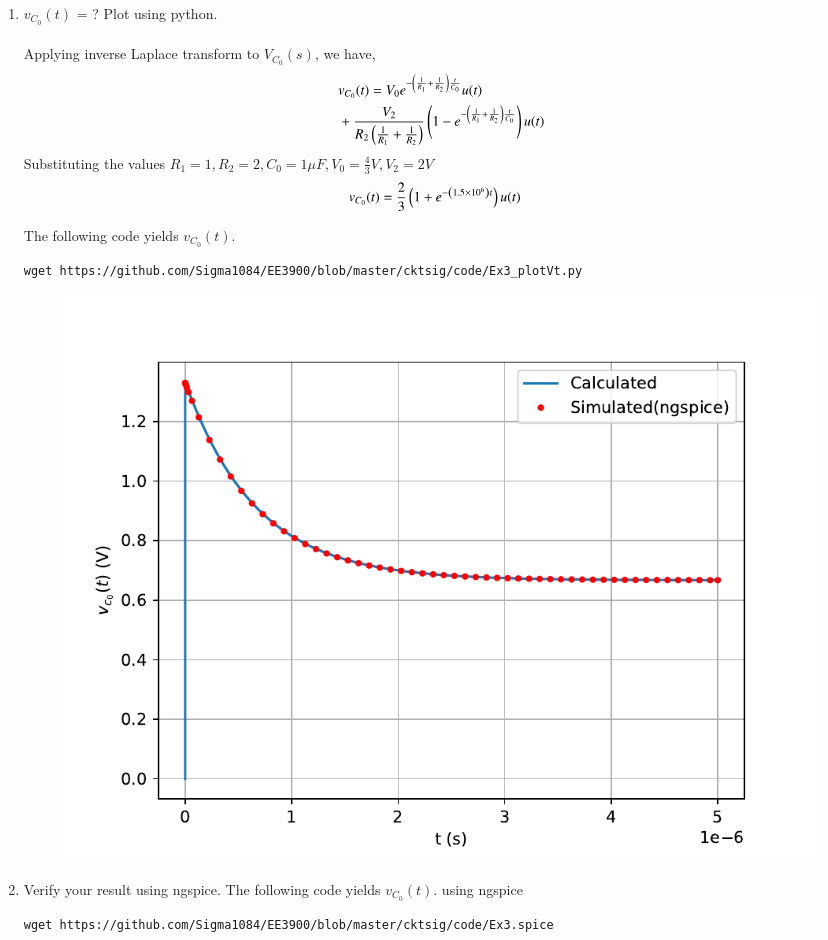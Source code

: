 \documentclass[journal,12pt,twocolumn]{IEEEtran}
\renewcommand\thesection{\arabic{section}}
\begin{document}
\begin{enumerate}[label=\arabic*.,ref=\thesection.\theenumi]
\item $v_{C_0}(t)$ = ? Plot using python.\\
	\solution\\
	Applying inverse Laplace transform to $V_{C_0}(s)$, we have,
	\begin{align*}
		&v_{C_0}(t) = V_0e^{-\left(\frac{1}{R_1} + \frac{1}{R_2}\right)\frac{t}{C_0}}u(t) \nonumber \\ 
		&+ \frac{V_2}{R_2\left(\frac{1}{R_1}+\frac{1}{R_2}\right)}\left(1 - e^{-\left(\frac{1}{R_1} + \frac{1}{R_2}\right)\frac{t}{C_0}}\right)u(t)
	\end{align*}
	Substituting the values $R_1=1, R_2=2, C_0=1\mu F, V_0=\frac{4}{3}V, V_2=2V$
	\begin{align}
		&v_{C_0}(t) = \frac{2}{3} \left(1 + e^{-\left(1.5 \times 10^6\right)t}\right)u(t)
		\label{eq:vc0t}
	\end{align}

	The following code yields $v_{C_0}(t)$.
	\begin{lstlisting}
wget https://github.com/Sigma1084/EE3900/blob/master/cktsig/code/Ex3_plotVt.py
	\end{lstlisting}

	\begin{figure}[!ht]
		\centering
		\includegraphics[width=\columnwidth]{figs/Ex3_vt.pdf}
		\caption {}
		\label{fig:q3_vc}
	\end{figure}


\item Verify your result using ngspice.
The following code yields $v_{C_0}(t)$. using ngspice
\begin{lstlisting}
wget https://github.com/Sigma1084/EE3900/blob/master/cktsig/code/Ex3.spice
\end{lstlisting}


\end{enumerate}
\end{document}
